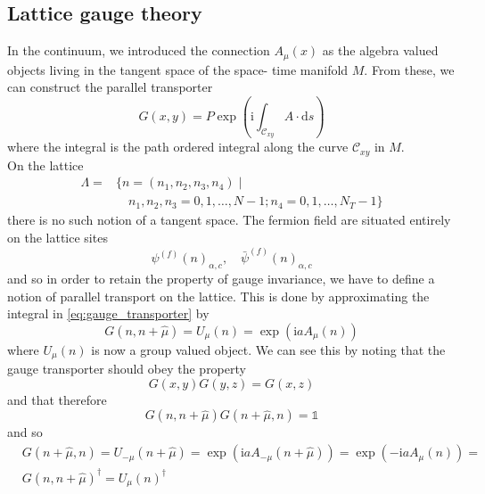 \documentclass[a4paper,10pt]{book}
\begin{document}
\subsection{Lattice gauge theory}\label{sec:lgt}
In the continuum, we introduced the connection $A_\mu(x)$ as the algebra valued objects living in the tangent space of the space- time manifold $M$. From these, we can construct the parallel transporter
\begin{equation}\label{eq:gauge_transporter}
G(x, y)=P \exp \left(\mathrm{i} \int_{\mathcal{C}_{x y}} A \cdot \mathrm{d} s\right)
\end{equation}
where the integral is the path ordered integral along the curve $\mathcal{C}_{x y}$ in $M$.\\On the lattice
\begin{equation}
\begin{aligned}
\Lambda=&\{n=\left(n_{1}, n_{2}, n_{3}, n_{4}\right) \mid \\
&\quad n_{1}, n_{2}, n_{3}=0,1, \ldots, N-1 ; n_{4}=0,1, \ldots, N_{T}-1\}
\end{aligned}
\end{equation}
there is no such notion of a tangent space. The fermion field are situated entirely on the lattice sites
\begin{equation}
\psi^{(f)}(n)_{\alpha, c}, \quad \bar{\psi}^{(f)}(n)_{\alpha, c}
\end{equation}
and so in order to retain the property of gauge invariance, we have to define a notion of parallel transport on the lattice. This is done by approximating the integral in \eqref{eq:gauge_transporter} by
\begin{equation}\label{eq:linkVariable_exponential}
G(n,n+\hat{\mu}) = U_{\mu}(n)=\exp \left(\mathrm{i} a A_{\mu}(n)\right)
\end{equation}
where $U_{\mu}(n)$ is now a group valued object. We can see this by noting that the gauge transporter should obey the property
\begin{equation}
G(x,y)G(y,z) = G(x,z)
\end{equation}
and that therefore 
\begin{equation}
G(n,n+\hat{\mu})G(n+\hat{\mu},n) = \mathbb{1}
\end{equation}
and so
\begin{equation}
\begin{aligned}
&G(n+\hat{\mu},n) = U_{-\mu}(n+\hat{\mu})=\exp \left(\mathrm{i} a A_{-\mu}(n+\hat{\mu})\right) = \exp \left(-\mathrm{i} a A_{\mu}(n)\right)=\\ &G(n,n+\hat{\mu})^\dagger = U_{\mu}(n)^\dagger
\end{aligned}
\end{equation}
\end{document}
